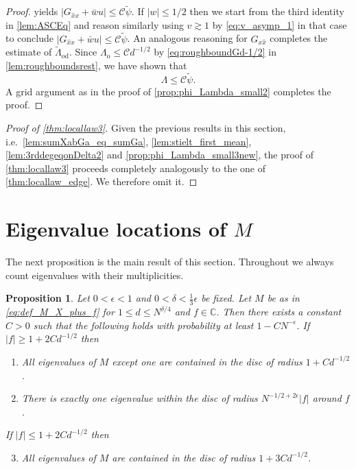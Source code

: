 \documentclass[10pt,a4paper]{amsart}
\newcommand{\abs}[1]{\left| #1 \right|}
\newcommand{\C}{\mathbb{C}}
\newtheorem{prop}{Proposition}[section]
\numberwithin{equation}{section}
\newcommand*\ubarr[1]{{\widehat{#1}}}
\begin{document}
\begin{proof}
		yields $\abs{G_{\ubarr{x}x} + \bar w u} \leq \mathcal C \widetilde{\psi}$. 
		If $\abs{w} \leq 1/2$ then we start from the third identity in \cref{lem:ASCEq} and reason similarly using $v \gtrsim 1$ by \eqref{eq:v_asymp_1} in that case  to conclude $\abs{G_{\ubarr{x}x} + \bar w u} \leq \mathcal C \widetilde{\psi}$. 
		An analogous reasoning for $G_{x \ubarr{x}}$ completes the estimate of $\widetilde{\Lambda}_{\mathrm{od}}$.
		Since ${\Lambda}_\mathrm{o}\leq \mathcal C d^{-1/2}$ by \eqref{eq:roughboundGd-1/2} in \cref{lem:roughboundsrest}, we have shown that 
		\begin{equation*}
			\Lambda \le \mathcal C \widetilde{\psi}. 
		\end{equation*}
		A grid argument as in the proof of \cref{prop:phi_Lambda_small2} completes the proof.
	\end{proof}
	
	\begin{proof}[Proof of \cref{thm:locallaw3}]
		 Given the previous results in this section, i.e.\ \cref{lem:sumXabGa_eq_sumGa}, \cref{lem:stielt_first_mean}, \cref{lem:3rddegeqonDelta2}
		and \cref{prop:phi_Lambda_small3new}, the proof of \cref{thm:locallaw3} 
		proceeds completely analogously to the one of 
		\cref{thm:locallaw_edge}. We therefore omit it. 
	\end{proof}
	
	
	
	\section{Eigenvalue locations of $M$} \label{sec:largest_eigenvalue}

 The next proposition is the main result of this section. Throughout we always count eigenvalues with their multiplicities. 

\begin{prop}\label{prop:spectrum_M} 
Let $0 < \epsilon < 1$ and $0 <\delta < \frac{1}{3}\epsilon$ be fixed. Let $M$ be as in \eqref{eq:def_M_X_plus_f} for $1 \le d \le N^{\delta/4}$ and $f \in \C$. Then there exists a  constant $C>0$ such that the following holds with probability at least $1- CN^{-\epsilon}$.
If $\abs{f} \geq 1 + 2 C d^{-1/2}$ then 
\begin{enumerate}[label=(\alph*)]
    \item \label{item:other_eigenvalues_disc} All eigenvalues of $M$ except one are contained in the disc of radius $  1 + C d^{-1/2} $.
    \item \label{item:large_eigenvalue} There is exactly one eigenvalue within the disc of radius $N^{-1/2 + 2\epsilon}|f|$ around $f$.
\end{enumerate}
If $\abs{f} \leq 1 + 2 C d^{-1/2}$ then 
\begin{enumerate}[label=(\alph*)]
\setcounter{enumi}{2} 
\item All eigenvalues of $M$ are contained in the disc of radius $  1 + 3C d^{-1/2} $.
\end{enumerate} 
\end{prop}
\end{document}
